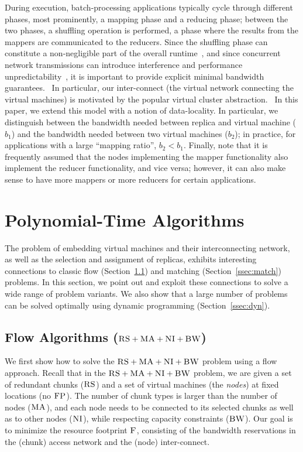 \documentclass[9pt]{sigcomm-alternate}
\newcommand{\CC}{\textsc{NI}}
\newcommand{\FP}{\textsc{FP}}
\newcommand{\RS}{\textsc{RS}}
\newcommand{\BW}{\textsc{BW}}
\newcommand{\MA}{\textsc{MA}}
\newcommand{\Cost}{\textsc{F}}
\newcommand{\CostTrans}{\ensuremath{b_1}}
\newcommand{\CostCom}{\ensuremath{b_2}}
\begin{document}
During execution, batch-processing applications typically cycle through different phases,
most prominently, a mapping phase and a reducing phase; between the two phases,
a shuffling operation is performed, a phase where the results from the mappers
are communicated to the reducers. Since the shuffling phase can constitute a
non-negligible part of the overall runtime~\cite{orchestra},
and since concurrent network transmissions can introduce interference and
performance unpredictability~\cite{amazonbw}, it is important
to provide explicit minimal bandwidth guarantees.~\cite{talk-about}
In particular, our inter-connect (the virtual network connecting the virtual machines)
is motivated by the popular virtual cluster abstraction.~\cite{oktopus,talk-about,proteus}
In this paper, we extend this model with a notion of data-locality.
In particular, we distinguish between the bandwidth needed between replica
and virtual machine ($\CostTrans$) and the bandwidth needed between
two virtual machines ($\CostCom$); in practice, for applications with a large
``mapping ratio'', $\CostCom<\CostTrans$. Finally, note that it is frequently assumed
that the nodes implementing the mapper functionality also implement the reducer functionality,
and vice versa; however, it can also make sense to have more mappers or more reducers for
certain applications.

\section{Polynomial-Time Algorithms}\label{sec:poly}

The problem of embedding virtual machines and their interconnecting network,
as well as the selection and assignment of replicas,
exhibits interesting connections to classic flow (Section~\ref{ssec:flow}) and
matching (Section~\ref{ssec:match}) problems. In this section, we point out and exploit these connections 
to solve a wide range
of problem variants. We also show that a large number of problems
can be solved optimally using dynamic programming (Section~\ref{ssec:dyn}).

\subsection{Flow Algorithms ($\RS+\MA+\CC+\BW$)}\label{ssec:flow}

We first show how to solve
the $\RS+\MA+\CC+\BW$ problem using a flow approach.
Recall that in the $\RS+\MA+\CC+\BW$ problem,
we are given a set of redundant chunks ($\RS$) and a set of virtual machines
(the \emph{nodes})
at fixed locations (no $\FP$). The number of chunk types is larger than the number
of nodes ($\MA$), and each node needs to be connected
to its selected chunks as well as to other nodes ($\CC$), while respecting
capacity constraints ($\BW$).
Our goal is to minimize the resource footprint $\Cost$, consisting
of the bandwidth reservations in the (chunk) access network and the (node) inter-connect.
\end{document}
